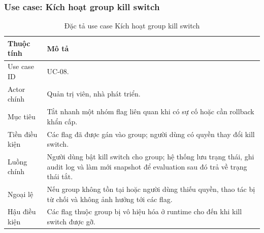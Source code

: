 \subsubsection{Use case: Kích hoạt group kill switch}

\begin{table}[H]
    \centering
    \caption{Đặc tả use case Kích hoạt group kill switch}
    \label{tab:uc-group-kill-switch}
    \begin{tabular}{p{} p{}}
        \toprule
        \textbf{Thuộc tính} & \textbf{Mô tả} \\
        \midrule
        Use case ID & UC-08. \\
        Actor chính & Quản trị viên, nhà phát triển. \\
        Mục tiêu & Tắt nhanh một nhóm flag liên quan khi có sự cố hoặc cần rollback khẩn cấp. \\
        Tiền điều kiện & Các flag đã được gán vào group; người dùng có quyền thay đổi kill switch. \\
        Luồng chính & Người dùng bật kill switch cho group; hệ thống lưu trạng thái, ghi audit log và làm mới snapshot để evaluation sau đó trả về trạng thái tắt. \\
        Ngoại lệ & Nếu group không tồn tại hoặc người dùng thiếu quyền, thao tác bị từ chối và không ảnh hưởng tới các flag. \\
        Hậu điều kiện & Các flag thuộc group bị vô hiệu hóa ở runtime cho đến khi kill switch được gỡ. \\
        \bottomrule
    \end{tabular}
\end{table}
